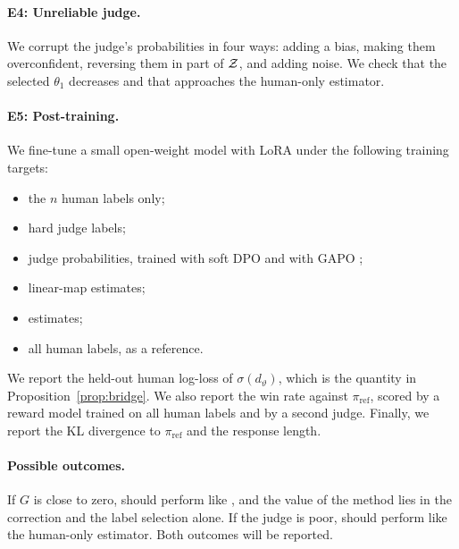 \paragraph{E4: Unreliable judge.}
We corrupt the judge's probabilities in four ways: adding a bias, making them overconfident,
reversing them in part of $\mathcal{Z}$, and adding noise. We check that the selected $\theta_1$ decreases
and that \dfsp{} approaches the human-only estimator.

\paragraph{E5: Post-training.}
We fine-tune a small open-weight model with LoRA \citep{hu2022lora} under the following training
targets:
\begin{itemize}
  \item the $n$ human labels only;
  \item hard judge labels;
  \item judge probabilities, trained with soft DPO and with GAPO \citep{furuta2024gapo};
  \item linear-map estimates;
  \item \dfsp{} estimates;
  \item all human labels, as a reference.
\end{itemize}
We report the held-out human log-loss of $\sigma(d_\vartheta)$, which is the quantity in
Proposition~\ref{prop:bridge}. We also report the win rate against $\pi_{\mathrm{ref}}$, scored by a
reward model trained on all human labels \citep{gao2023scaling} and by a second judge. Finally, we
report the KL divergence to $\pi_{\mathrm{ref}}$ and the response length.

\paragraph{Possible outcomes.}
If $G$ is close to zero, \dfsp{} should perform like \sfsp, and the value of the method lies in the
correction and the label selection alone. If the judge is poor, \dfsp{} should perform like the
human-only estimator. Both outcomes will be reported.

